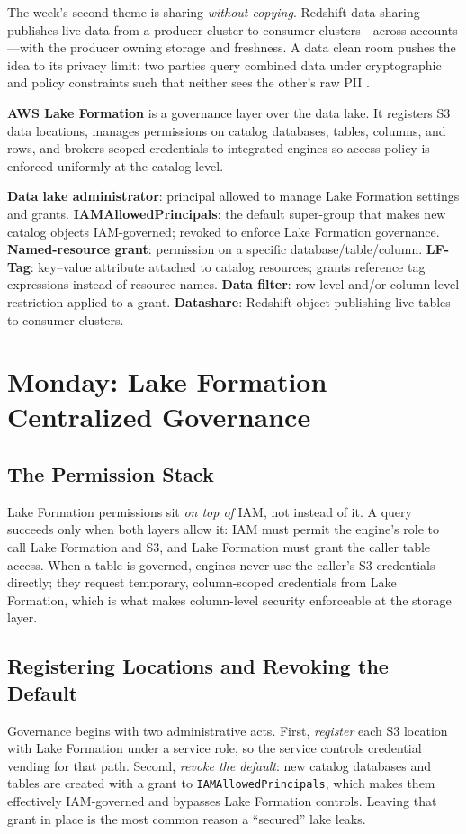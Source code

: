The week's second theme is sharing \emph{without copying}. Redshift data sharing publishes live data from a producer cluster to consumer clusters---across accounts---with the producer owning storage and freshness. A data clean room pushes the idea to its privacy limit: two parties query combined data under cryptographic and policy constraints such that neither sees the other's raw PII \cite{awsCleanRoomsDocs}.

\begin{definitionbox}
\textbf{AWS Lake Formation} is a governance layer over the data lake. It registers S3 data locations, manages permissions on catalog databases, tables, columns, and rows, and brokers scoped credentials to integrated engines so access policy is enforced uniformly at the catalog level.
\end{definitionbox}

\begin{keyterms}
\textbf{Data lake administrator}: principal allowed to manage Lake Formation settings and grants. \textbf{IAMAllowedPrincipals}: the default super-group that makes new catalog objects IAM-governed; revoked to enforce Lake Formation governance. \textbf{Named-resource grant}: permission on a specific database/table/column. \textbf{LF-Tag}: key--value attribute attached to catalog resources; grants reference tag expressions instead of resource names. \textbf{Data filter}: row-level and/or column-level restriction applied to a grant. \textbf{Datashare}: Redshift object publishing live tables to consumer clusters.
\end{keyterms}

\section{Monday: Lake Formation Centralized Governance}
\subsection{The Permission Stack}
Lake Formation permissions sit \emph{on top of} IAM, not instead of it. A query succeeds only when both layers allow it: IAM must permit the engine's role to call Lake Formation and S3, and Lake Formation must grant the caller table access. When a table is governed, engines never use the caller's S3 credentials directly; they request temporary, column-scoped credentials from Lake Formation, which is what makes column-level security enforceable at the storage layer.

\subsection{Registering Locations and Revoking the Default}
Governance begins with two administrative acts. First, \emph{register} each S3 location with Lake Formation under a service role, so the service controls credential vending for that path. Second, \emph{revoke the default}: new catalog databases and tables are created with a grant to \texttt{IAMAllowedPrincipals}, which makes them effectively IAM-governed and bypasses Lake Formation controls. Leaving that grant in place is the most common reason a ``secured'' lake leaks.

